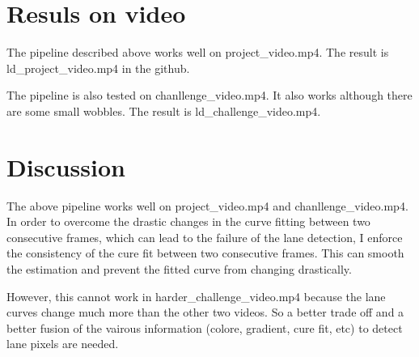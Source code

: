 \documentclass[12pt]{article}
\begin{document}
\section{Resuls on video}
The pipeline described above works well on project\_video.mp4. The result is ld\_project\_video.mp4 in the github.

The pipeline is also tested on chanllenge\_video.mp4. It also works although there are some small wobbles. The result is ld\_challenge\_video.mp4.


\section{Discussion}
The above pipeline works well on project\_video.mp4 and chanllenge\_video.mp4. In order to overcome the drastic changes in the curve fitting between two consecutive frames, which can lead to the failure of the lane detection, I enforce the consistency of the cure fit between two consecutive frames. This can smooth the estimation and prevent the fitted curve from changing drastically. 

However, this cannot work in harder\_challenge\_video.mp4 because the lane curves change much more than the other two videos. So a better trade off and a better fusion of the vairous information (colore, gradient, cure fit, etc) to detect lane pixels are needed. 
\end{document}
